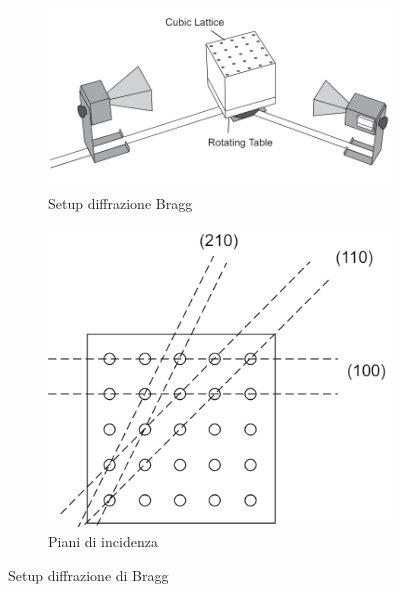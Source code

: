 \documentclass[letterpaper,12pt]{article}
\begin{document}
\begin{figure}[h!]
	\centering
	\begin{subfigure}[b]{0.48\textwidth} 
		\centering
		\includegraphics[width=\textwidth]{setup_bragg.png}
		\caption{Setup diffrazione Bragg}
		\label{fig:Setup Bragg}
	\end{subfigure}
	\hfill 
	\begin{subfigure}[b]{0.3\textwidth} 
		\centering
		\includegraphics[width=\textwidth]{piani_bragg.png}
		\caption{Piani di incidenza}
		\label{fig:Piani di Bragg}
	\end{subfigure}
	\caption{Setup diffrazione di Bragg}
\end{figure}
\end{document}
